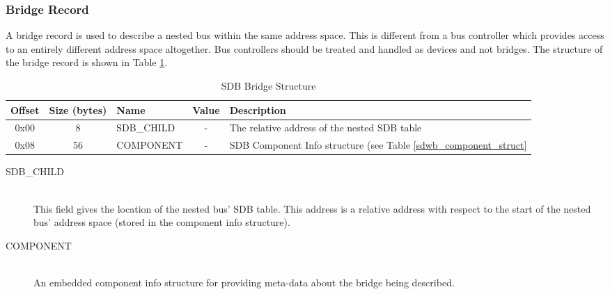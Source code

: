 \documentclass[a4paper, 12pt]{article}
\begin{document}
\subsubsection{Bridge Record}

A bridge record is used to describe a nested bus within the same address space. This is different from
a bus controller which provides access to an entirely different address space altogether. Bus
controllers should be treated and handled as devices and not bridges. The structure of the bridge record
is shown in Table \ref{sdwb_bridge_struct}.

\begin{center}
  \begin{savenotes}
    \begin{table}[!ht]\footnotesize
      \caption{SDB Bridge Structure}\label{sdwb_bridge_struct}\centering
        \begin{tabular}{| c | c | l | c | p{5cm} |} \hline
        Offset & Size (bytes) & Name & Value & Description \\ \hline
        0x00 & 8 & SDB\_CHILD & - & The relative address of the nested SDB table \\ \hline
        0x08 & 56 & COMPONENT & - & SDB Component Info structure (see Table \ref{sdwb_component_struct} \\ \hline
        \end{tabular}
    \end{table}
  \end{savenotes}
\end{center}

\begin{description}
\item[SDB\_CHILD] \hfill \\
This field gives the location of the nested bus' SDB table. This address is a relative address
with respect to the start of the nested bus' address space (stored in the component info structure).

\item[COMPONENT] \hfill \\
An embedded component info structure for providing meta-data about the bridge being described.
\end{description}
\end{document}
